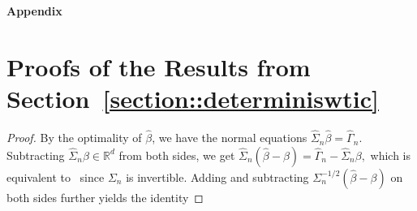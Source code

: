 \documentclass{article}
\begin{document}
 \begin{appendices}
 
 \begin{center}{\Large{\bf Appendix}}
 \end{center}
 
 \section{Proofs of the Results from Section~\ref{section::determiniswtic}}
 \label{appendix:deterministic}
 
 
 \begin{proof}
 By the optimality of $\widehat{\beta}$, we have the normal equations $\widehat{\Sigma}_n\widehat{\beta} = \widehat{\Gamma}_n.$
 Subtracting $\widehat{\Sigma}_n\beta\in\mathbb{R}^d$ from both sides, we get
 $\widehat{\Sigma}_n(\widehat{\beta} - \beta) = \widehat{\Gamma}_n - \widehat{\Sigma}_n\beta,$
 which is equivalent to
 \
 since $\Sigma_n$ is invertible.
 Adding and subtracting $\Sigma^{-1/2}_n (\widehat{\beta}  - \beta)$ on both sides further yields the identity
 
 
 
 
 
 
 
 
 

\end{proof}
\end{appendices}
\end{document}
